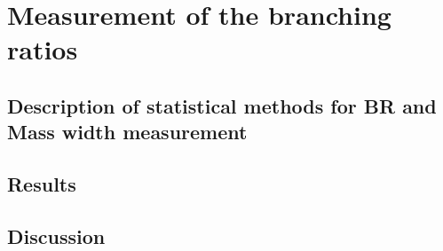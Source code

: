 \section{Measurement of the branching ratios}
\label{subsec:sigmaBR}

\subsection{Description of statistical methods for BR and Mass width measurement}
\subsection{Results}
\subsection{Discussion}
